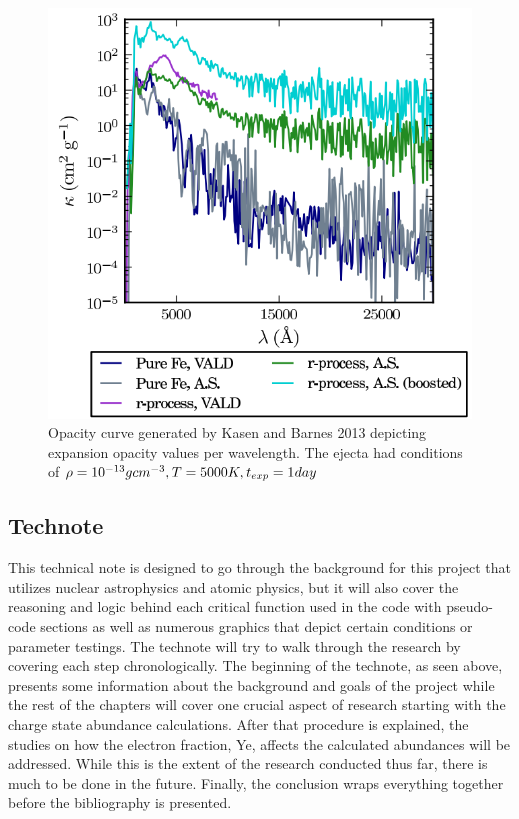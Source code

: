 \documentclass[11pt,a4paper]{article}
\begin{document}
\begin{figure}[h!]
  \includegraphics[scale=.5, width=1\textwidth]{opacity.png}
  \caption{Opacity curve generated by Kasen and Barnes 2013 depicting expansion opacity values per wavelength. The ejecta had conditions of $\rho = 10^{-13} g cm^{-3}, \hspace{.01cm} T = 5000 K, \hspace{.01cm} t_{exp} = 1 \hspace{.01cm} day $ }
\end{figure}

\subsection{Technote}

This technical note is designed to go through the background for this project that utilizes nuclear astrophysics and atomic physics, but it will also cover the reasoning and logic behind each critical function used in the code with pseudo-code sections as well as numerous graphics that depict certain conditions or parameter testings. The technote will try to walk through the research by covering each step chronologically. The beginning of the technote, as seen above, presents some information about the background and goals of the project while the rest of the chapters will cover one crucial aspect of research starting with the charge state abundance calculations. After that procedure is explained, the studies on how the electron fraction, Ye, affects the calculated abundances will be addressed. While this is the extent of the research conducted thus far, there is much to be done in the future. Finally, the conclusion wraps everything together before the bibliography is presented.
\end{document}
